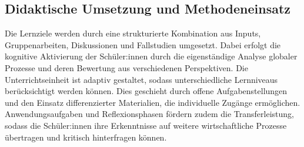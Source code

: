 \subsection{Didaktische Umsetzung und Methodeneinsatz}
Die Lernziele werden durch eine strukturierte Kombination aus Inputs, Gruppenarbeiten, Diskussionen und Fallstudien umgesetzt. Dabei erfolgt die kognitive Aktivierung der Schüler:innen durch die eigenständige Analyse globaler Prozesse und deren Bewertung aus verschiedenen Perspektiven. Die Unterrichtseinheit ist adaptiv gestaltet, sodass unterschiedliche Lernniveaus berücksichtigt werden können. Dies geschieht durch offene Aufgabenstellungen und den Einsatz differenzierter Materialien, die individuelle Zugänge ermöglichen. Anwendungsaufgaben und Reflexionsphasen fördern zudem die Transferleistung, sodass die Schüler:innen ihre Erkenntnisse auf weitere wirtschaftliche Prozesse übertragen und kritisch hinterfragen können.